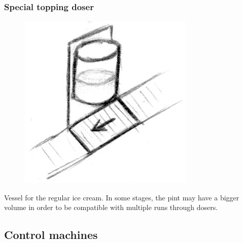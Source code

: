 \documentclass[a4paper]{scrartcl}
\begin{document}
        \subsubsection{Special topping doser}
            \begin{minipage}[t][6em][t]{\textwidth}
                \begin{figure}
                    \vspace{-20pt}
                    \includegraphics[scale=1]{devices/special_topping_doser}
                    \vspace{-20pt}
                \end{figure}

                Vessel for the regular ice cream. In some stages, the pint may have
                a bigger volume in order to be compatible with multiple runs through
                dosers.
            \end{minipage}

    \subsection{Control machines}
\end{document}

